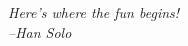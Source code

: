 {\begin{small}%
\begin{flushright}%
\it
Here's where the fun begins!\\
--Han Solo
\end{flushright}%
\end{small}%
\vspace{.5cm}}
